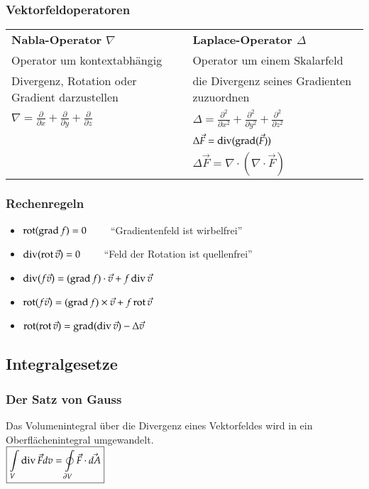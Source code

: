 \subsubsection{Vektorfeldoperatoren}
\begin{tabular}{ll}
	\textbf{Nabla-Operator $\nabla$} & \textbf{Laplace-Operator $\Delta$}\\
	Operator um kontextabhängig & Operator um einem Skalarfeld\\
	Divergenz, Rotation oder Gradient darzustellen  &  die Divergenz seines Gradienten zuzuordnen\\
	$\nabla=\frac{\partial}{\partial x}+\frac{\partial}{\partial y}+\frac{\partial}{\partial z}$&$\Delta=\frac{\partial^{2}}{\partial x^{2}}+\frac{\partial^{2}}{\partial y^{2}}+\frac{\partial^{2}}{\partial z^{2}}$\\
	&$\Delta \vec{F} = \operatorname{div}(\operatorname{grad}(\vec{F}))$\\
	&$\Delta \vec{F} = \nabla \cdot (\nabla \cdot \vec{F})$\\	 
\end{tabular}
\subsubsection{Rechenregeln}
\begin{itemize}
	\item $\operatorname{rot}(\operatorname{grad} f) = 0 \qquad $ ``Gradientenfeld ist wirbelfrei''
	\item $\operatorname{div}(\operatorname{rot} \vec{v}) = 0 \qquad $ ``Feld der Rotation ist quellenfrei''
	\item $\operatorname{div}(f\vec{v}) = (\operatorname{grad} f) \cdot \vec{v} + f \operatorname{div} \vec{v}$
	\item $\operatorname{rot}(f\vec{v}) = (\operatorname{grad} f) \times \vec{v} + f \operatorname{rot} \vec{v}$
	\item $\operatorname{rot}(\operatorname{rot} \vec{v}) = \operatorname{grad}(\operatorname{div} \vec{v}) - \Delta \vec{v}$
\end{itemize}
\clearpage
\pagebreak
\subsection{Integralgesetze}
\subsubsection{Der Satz von Gauss}
Das Volumenintegral über die Divergenz eines Vektorfeldes wird in ein Oberflächenintegral umgewandelt.\\
$\boxed{\int\limits_V \operatorname{div} \vec F dv = \oint\limits_{\partial V} \vec F \cdot \vec{dA}}$
